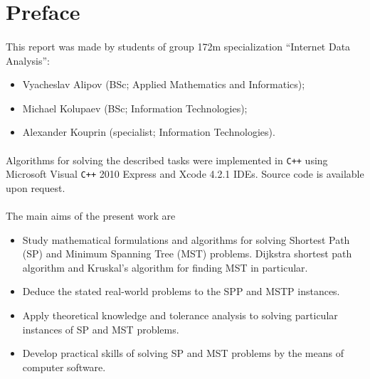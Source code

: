 \section{Preface}

\paragraph{}
	This report was made by students of group 172m specialization ``Internet Data Analysis'':

\begin{itemize}
	\item Vyacheslav Alipov (BSc; Applied Mathematics and Informatics);
	\item Michael Kolupaev (BSc; Information Technologies);
	\item Alexander Kouprin (specialist; Information Technologies).
\end{itemize}

\paragraph{}
	Algorithms for solving the described tasks were implemented in \verb!C++! using Microsoft Visual \verb!C++! 2010 Express and Xcode 4.2.1 IDEs. Source code is available upon request.

\paragraph{}
	The main aims of the present work are 
\begin{itemize}
	\item Study mathematical formulations and algorithms for solving Shortest Path (SP) and Minimum Spanning Tree (MST) problems. Dijkstra shortest path algorithm and Kruskal's algorithm for finding MST in particular.
	\item Deduce the stated real-world problems to the SPP and MSTP instances.
	\item Apply theoretical knowledge and tolerance analysis to solving particular instances of SP and MST problems.
	\item Develop practical skills of solving SP and MST problems by the means of computer software.
\end{itemize}

